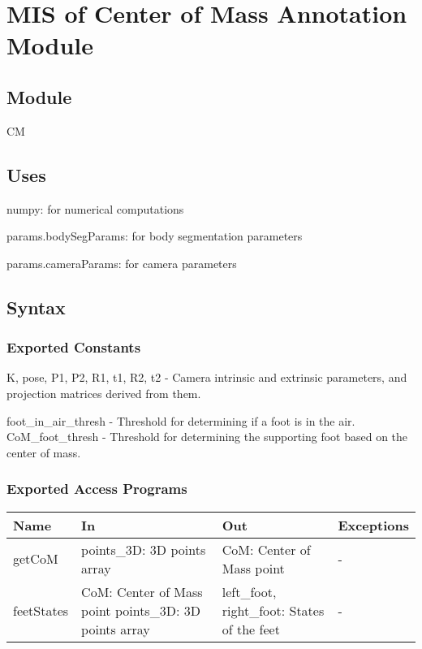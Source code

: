 \documentclass[12pt, titlepage]{article}
\begin{document}
\section{MIS of Center of Mass Annotation Module} \label{sec:centerofmass}

\subsection{Module}
CM

\subsection{Uses}

\noindent numpy: for numerical computations

\noindent params.bodySegParams: for body segmentation parameters

\noindent params.cameraParams: for camera parameters

\subsection{Syntax}

\subsubsection{Exported Constants}

\noindent K, pose, P1, P2, R1, t1, R2, t2 - Camera intrinsic and extrinsic parameters, and
projection matrices derived from them.

\noindent foot\_in\_air\_thresh - Threshold for determining if a foot is in the air.
\noindent CoM\_foot\_thresh - Threshold for determining the supporting foot based on the center of mass.

\subsubsection{Exported Access Programs}
\begin{tabularx}{\textwidth}{X X X X}
  \hline
  \textbf{Name}    & \textbf{In}                                                 & \textbf{Out}                                      & \textbf{Exceptions} \\
  \hline
  getCoM     & points\_3D: 3D points array                           & CoM: Center of Mass point                   & -             \\
  feetStates & CoM: Center of Mass point points\_3D: 3D points array & left\_foot, right\_foot: States of the feet & -             \\
  \hline
\end{tabularx}
\end{document}
